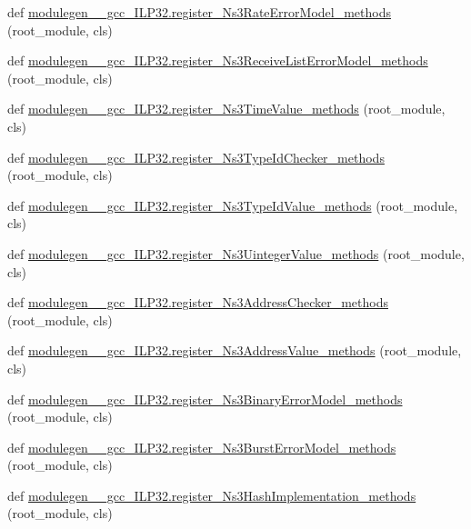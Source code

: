\begin{DoxyCompactItemize}
\item 
def \hyperlink{namespacemodulegen____gcc__ILP32_a43e7a30d0d40b70325dea7b5ffc3bd08}{modulegen\+\_\+\+\_\+gcc\+\_\+\+I\+L\+P32.\+register\+\_\+\+Ns3\+Rate\+Error\+Model\+\_\+methods} (root\+\_\+module, cls)
\item 
def \hyperlink{namespacemodulegen____gcc__ILP32_ac6153ad3148a9bb1ae86beaf7dbcdbe3}{modulegen\+\_\+\+\_\+gcc\+\_\+\+I\+L\+P32.\+register\+\_\+\+Ns3\+Receive\+List\+Error\+Model\+\_\+methods} (root\+\_\+module, cls)
\item 
def \hyperlink{namespacemodulegen____gcc__ILP32_a1105d61b4c389df61b8b83b0a25cc654}{modulegen\+\_\+\+\_\+gcc\+\_\+\+I\+L\+P32.\+register\+\_\+\+Ns3\+Time\+Value\+\_\+methods} (root\+\_\+module, cls)
\item 
def \hyperlink{namespacemodulegen____gcc__ILP32_a8cc76f23a8cb33ad3a0e4d77e8fbee0a}{modulegen\+\_\+\+\_\+gcc\+\_\+\+I\+L\+P32.\+register\+\_\+\+Ns3\+Type\+Id\+Checker\+\_\+methods} (root\+\_\+module, cls)
\item 
def \hyperlink{namespacemodulegen____gcc__ILP32_a39c112d1c935b295e15786cb622c73a5}{modulegen\+\_\+\+\_\+gcc\+\_\+\+I\+L\+P32.\+register\+\_\+\+Ns3\+Type\+Id\+Value\+\_\+methods} (root\+\_\+module, cls)
\item 
def \hyperlink{namespacemodulegen____gcc__ILP32_ac714dce8d474460352595c8579b4b110}{modulegen\+\_\+\+\_\+gcc\+\_\+\+I\+L\+P32.\+register\+\_\+\+Ns3\+Uinteger\+Value\+\_\+methods} (root\+\_\+module, cls)
\item 
def \hyperlink{namespacemodulegen____gcc__ILP32_a6cddc7786a1240bac0c2c11d2e5e40f3}{modulegen\+\_\+\+\_\+gcc\+\_\+\+I\+L\+P32.\+register\+\_\+\+Ns3\+Address\+Checker\+\_\+methods} (root\+\_\+module, cls)
\item 
def \hyperlink{namespacemodulegen____gcc__ILP32_a73078c37ac27c6fd2ec5e6a012ec4c0d}{modulegen\+\_\+\+\_\+gcc\+\_\+\+I\+L\+P32.\+register\+\_\+\+Ns3\+Address\+Value\+\_\+methods} (root\+\_\+module, cls)
\item 
def \hyperlink{namespacemodulegen____gcc__ILP32_a6b7ff4a4607924d57d97005a37be20d6}{modulegen\+\_\+\+\_\+gcc\+\_\+\+I\+L\+P32.\+register\+\_\+\+Ns3\+Binary\+Error\+Model\+\_\+methods} (root\+\_\+module, cls)
\item 
def \hyperlink{namespacemodulegen____gcc__ILP32_af7faf52233768a5c4bd01ce5f5e99ec6}{modulegen\+\_\+\+\_\+gcc\+\_\+\+I\+L\+P32.\+register\+\_\+\+Ns3\+Burst\+Error\+Model\+\_\+methods} (root\+\_\+module, cls)
\item 
def \hyperlink{namespacemodulegen____gcc__ILP32_acbacaf626a5a437cc46ab734cfde3cb8}{modulegen\+\_\+\+\_\+gcc\+\_\+\+I\+L\+P32.\+register\+\_\+\+Ns3\+Hash\+Implementation\+\_\+methods} (root\+\_\+module, cls)

\end{DoxyCompactItemize}
